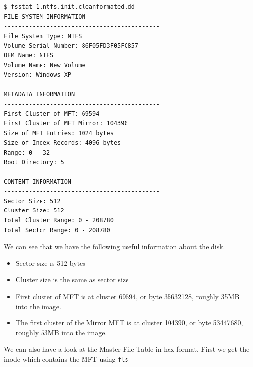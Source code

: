 \documentclass[a4paper,
    11pt,
    normalheadings,
    parindent,
    UKenglish,
    abstracton,
    ]{scrartcl}
\begin{document}
\begin{verbatim}
$ fsstat 1.ntfs.init.cleanformated.dd
FILE SYSTEM INFORMATION
--------------------------------------------
File System Type: NTFS
Volume Serial Number: 86F05FD3F05FC857
OEM Name: NTFS
Volume Name: New Volume
Version: Windows XP

METADATA INFORMATION
--------------------------------------------
First Cluster of MFT: 69594
First Cluster of MFT Mirror: 104390
Size of MFT Entries: 1024 bytes
Size of Index Records: 4096 bytes
Range: 0 - 32
Root Directory: 5

CONTENT INFORMATION
--------------------------------------------
Sector Size: 512
Cluster Size: 512
Total Cluster Range: 0 - 208780
Total Sector Range: 0 - 208780
\end{verbatim}
We can see that we have the following useful information about the disk.
\begin{itemize}
        \item Sector size is 512 bytes
        \item Cluster size is the same as sector size
        \item First cluster of MFT is at cluster 69594, or byte 35632128, roughly 35MB into the image.
        \item The first cluster of the Mirror MFT is at cluster 104390, or byte 53447680, roughly 53MB into the image.
\end{itemize}

We can also have a look at the Master File Table in hex format. First we get the inode which contains the MFT using \texttt{fls}
\end{document}
